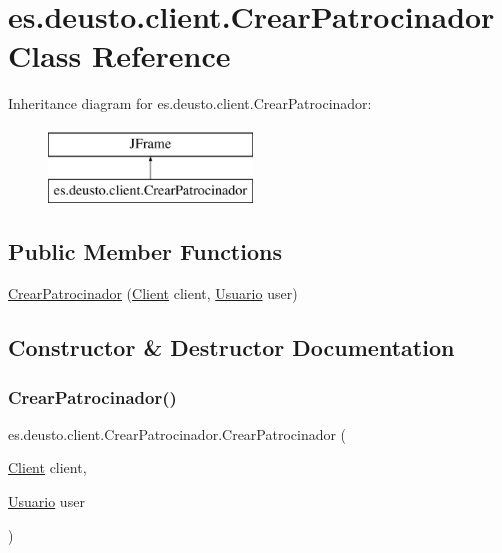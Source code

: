 \hypertarget{classes_1_1deusto_1_1client_1_1_crear_patrocinador}{}\section{es.\+deusto.\+client.\+Crear\+Patrocinador Class Reference}
\label{classes_1_1deusto_1_1client_1_1_crear_patrocinador}
Inheritance diagram for es.\+deusto.\+client.\+Crear\+Patrocinador\+:\begin{figure}[H]
\begin{center}
\leavevmode
\includegraphics[height=2.000000cm]{classes_1_1deusto_1_1client_1_1_crear_patrocinador}
\end{center}
\end{figure}
\subsection*{Public Member Functions}
\begin{DoxyCompactItemize}
\item 
\mbox{\hyperlink{classes_1_1deusto_1_1client_1_1_crear_patrocinador_a0fcd23c4176789251c30c30eeb9c201c}{Crear\+Patrocinador}} (\mbox{\hyperlink{classes_1_1deusto_1_1client_1_1_client}{Client}} client, \mbox{\hyperlink{classes_1_1deusto_1_1server_1_1jdo_1_1_usuario}{Usuario}} user)
\end{DoxyCompactItemize}


\subsection{Constructor \& Destructor Documentation}
\mbox{\label{classes_1_1deusto_1_1client_1_1_crear_patrocinador_a0fcd23c4176789251c30c30eeb9c201c}} 
\subsubsection{\texorpdfstring{CrearPatrocinador()}{CrearPatrocinador()}}
{\footnotesize\ttfamily es.\+deusto.\+client.\+Crear\+Patrocinador.\+Crear\+Patrocinador (\begin{DoxyParamCaption}\item[{\mbox{\hyperlink{classes_1_1deusto_1_1client_1_1_client}{Client}}}]{client,  }\item[{\mbox{\hyperlink{classes_1_1deusto_1_1server_1_1jdo_1_1_usuario}{Usuario}}}]{user }\end{DoxyParamCaption})}




